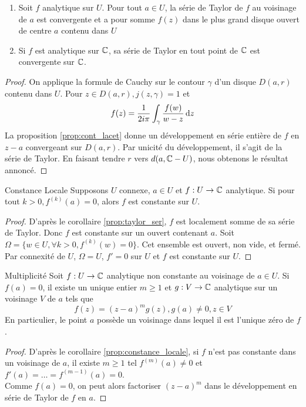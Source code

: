 \documentclass{cours}
\begin{document}
\begin{corollaire}{}{}\label{prop:taylor_ser}
    \begin{enumerate}
        \item Soit $f$ analytique sur $U$. Pour tout $a \in U$, la série de Taylor de $f$ au voisinage de $a$ est convergente et a pour somme $f(z)$ dans le plus grand disque ouvert de centre $a$ contenu dans $U$
        \item Si $f$ est analytique sur $\mathbb{C}$, sa série de Taylor en tout point de $\mathbb{C}$ est convergente sur $\mathbb{C}$. 
    \end{enumerate}
\end{corollaire}
\begin{proof}
    On applique la formule de Cauchy sur le contour $\gamma$ d'un disque $D(a, r)$ contenu dans $U$. Pour $z \in D(a, r), j(z, \gamma) = 1$ et 
    \[
        f(z) = \frac{1}{2i\pi}\int_{\gamma}^{}\frac{f(w)}{w -z}{\rm \, d} z
    \]
    La proposition \ref{prop:cont_lacet} donne un développement en série entière de $f$ en $z - a$ convergeant sur $D(a, r)$. Par unicité du développement, il s'agit de la série de Taylor. En faisant tendre $r$ vers $d(a, \mathbb{C} - U)$, nous obtenons le résultat annoncé. 
\end{proof}

\begin{corollaire}{Constance Locale}{}\label{prop:constance_locale}
    Supposons $U$ connexe, $a \in U$ et $f : U \to \mathbb{C}$ analytique. Si pour tout $k > 0, f^{(k)}(a) = 0$, alors $f$ est constante sur $U$. 
\end{corollaire}
\begin{proof}
    D'après le corollaire \ref{prop:taylor_ser}, $f$ est localement somme de sa série de Taylor. Donc $f$ est constante sur un ouvert contenant $a$. Soit $\Omega = \{w \in U, \forall k > 0, f^{(k)}(w) = 0\}$. Cet ensemble est ouvert, non vide, et fermé. Par connexité de $U$, $\Omega = U$, $f' = 0$ sur $U$ et $f$ est constante sur $U$.
\end{proof}

\begin{théorème}{Multiplicité}{}
    Soit $f : U \to \mathbb{C}$ analytique non constante au voisinage de $a \in U$. Si $f(a) = 0$, il existe un unique entier $m \geq 1$ et $g : V \to \mathbb{C}$ analytique sur un voisinage $V$ de $a$ tels que 
    \[
        f(z) = \left(z - a\right)^{m}g(z), g(a) \neq 0, z\in V
    \]
    En particulier, le point $a$ possède un voisinage dans lequel il est l'unique zéro de $f$.
\end{théorème}
\begin{proof}
    D'après le corollaire \ref{prop:constance_locale}, si $f$ n'est pas constante dans un voisinage de $a$, il existe $m \geq 1$ tel $f^{(m)}(a) \neq 0$ et $f'(a) = \ldots = f^{(m-1)}(a) = 0$.\\
    Comme $f(a) = 0$, on peut alors factoriser $(z -a)^{m}$ dans le développement en série de Taylor de $f$ en $a$.
\end{proof}
\end{document}
